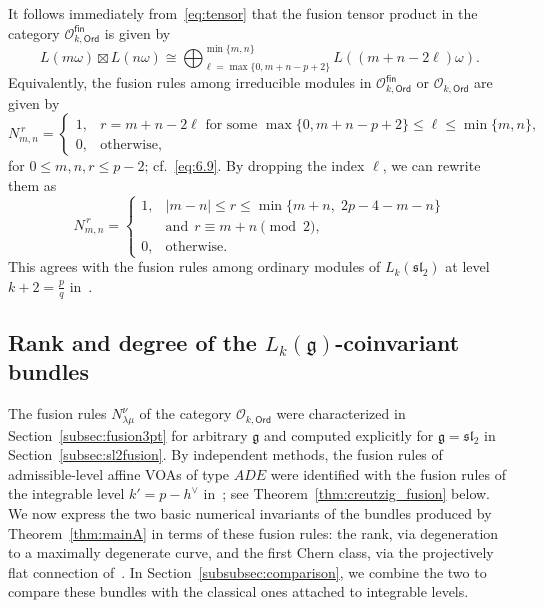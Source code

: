\documentclass[12pt,a4paper,reqno]{amsart}
\numberwithin{equation}{section}
\theoremstyle{definition}
\newcommand{\g}{\mathfrak{g}}
\renewcommand{\sl}{\mathfrak{sl}}
\def\O{\mathcal{O}}
\def\Ord{\mathsf{Ord}}
\def\fin{\mathsf{fin}}
\def\la{\lambda}
\def\om{\omega}
\begin{document}
It follows immediately from~\eqref{eq:tensor} that the fusion tensor product in the category $\O_{k,\Ord}^\fin$ is given by
\[
L(m\om)\boxtimes L(n\om)\cong \bigoplus_{\ell=\max\{0,m+n-p+2\}}^{\min\{m,n\}} L((m+n-2\ell)\om).
\]
Equivalently, the fusion rules among irreducible modules in $\O_{k,\Ord}^\fin$ or $\O_{k,\Ord}$ are given by
\[
N_{m,n}^{\,r}
=
\begin{cases}
1,
&
r=m+n-2\ell
\text{ for some }
\max\{0,m+n-p+2\}\le \ell\le\min\{m,n\},\\[4pt]
0,
&\text{otherwise},
\end{cases}
\]
 for $0\leq m,n,r\leq p-2$; cf.\ \eqref{eq:6.9}.
By dropping the index $\ell$, we can rewrite them as
\begin{equation}\label{eq:fusionrules}
N_{m,n}^{\,r}
=
\begin{cases}
1,
&
|m-n|\le r\le
\min\{m+n,\;2p-4-m-n\}\\
& \text{and}\ \ r\equiv m+n\pmod{2},\\
0, &\text{otherwise}.
\end{cases}
\end{equation}
This agrees with the fusion rules among ordinary modules of $L_k(\sl_2)$ at level $k+2=\frac{p}{q}$ in~\cite{DLM96,feigin1994fusion,creutzig2018braided,Creutzig19}.



\subsection{Rank and degree of the $L_k(\g)$-coinvariant bundles}\label{subsec:rank_trees}

The fusion rules $N_{\la\mu}^\nu$ of the category $\O_{k,\Ord}$ were characterized in Section~\ref{subsec:fusion3pt} for arbitrary $\g$ and computed explicitly for $\g=\sl_2$ in Section~\ref{subsec:sl2fusion}. By independent methods, the fusion rules of admissible-level affine VOAs of type $ADE$ were identified with the fusion rules of the integrable level $k'=p-h^\vee$ in~\cite[Corollary 7.4]{Creutzig19}; see Theorem~\ref{thm:creutzig_fusion} below. We now express the two basic numerical invariants of the bundles produced by Theorem~\ref{thm:mainA} in terms of these fusion rules: the rank, via degeneration to a maximally degenerate curve, and the first Chern class, via the projectively flat connection of~\cite{DGT1}. In Section~\ref{subsubsec:comparison}, we combine the two to compare these bundles with the classical ones attached to integrable levels.
\end{document}
